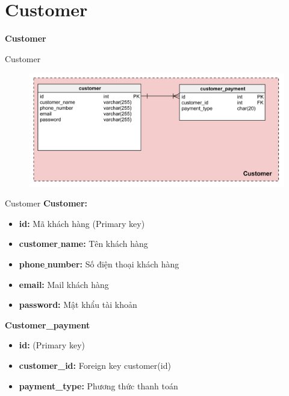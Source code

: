 \documentclass[aspectratio=43,xcolor=dvipsnames]{beamer}
\begin{document}
	\section{Customer}
	\begin{frame}
		\textcolor{structure}{\Huge{\textbf{Customer}}}
	\end{frame}
	\begin{frame}{Customer}
		\begin{figure}[ht!]
			\centerline{\includegraphics[width=1\textwidth]{customer.png}}
			\label{fig:ass1}
		\end{figure}
	\end{frame}
	\begin{frame}{Customer}
		\textcolor{structure}{\large{\textbf{Customer:}}}
		\begin{itemize}
			\item \textbf{id:} Mã khách hàng (Primary key)
			\item \textbf{customer$\_$name:} Tên khách hàng
			\item \textbf{phone$\_$number:} Số điện thoại khách hàng
			\item \textbf{email:} Mail khách hàng
			\item \textbf{password:} Mật khẩu tài khoản
		\end{itemize}
		\textcolor{structure}{\large{\textbf{Customer\_payment}}}
		\begin{itemize}
			\item \textbf{id:} (Primary key)
			\item \textbf{customer\_id:} Foreign key customer(id)
			\item \textbf{payment\_type:} Phương thức thanh toán
		\end{itemize}
	\end{frame}
\end{document}
